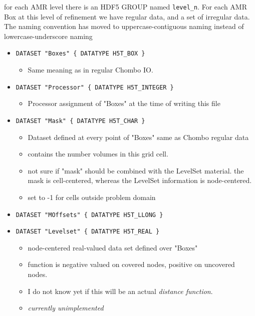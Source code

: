 for each AMR level there is an HDF5 GROUP named {\tt level\_n}.  For each AMR Box at this
level of refinement we have regular data, and a set of irregular data.  The naming convention
has moved to uppercase-contiguous naming instead of lowercase-underscore naming
\begin{itemize}

\item {\tt DATASET "Boxes" \{ DATATYPE  H5T\_BOX \}}
    \begin{itemize} \item  Same meaning as in regular Chombo IO. \end{itemize}
\item {\tt DATASET "Processor" \{ DATATYPE  H5T\_INTEGER \}}
      \begin{itemize} \item Processor assignment of "Boxes" at the time of writing this file \end{itemize}


\item {\tt DATASET "Mask" \{ DATATYPE  H5T\_CHAR \} }
    \begin{itemize}\item  Dataset defined at every point of "Boxes" same as Chombo regular data
                   \item  contains the number volumes in this grid cell.
                   \item not sure if "mask" should be combined with the LevelSet material. 
                    the mask is cell-centered, whereas the LevelSet information is node-centered.
                   \item set to -1 for cells outside problem domain
     \end{itemize}
\item  {\tt DATASET "MOffsets" \{ DATATYPE  H5T\_LLONG \} }

\item {\tt DATASET "Levelset" \{ DATATYPE  H5T\_REAL \} }
          \begin{itemize}
            \item node-centered real-valued data set defined over  "Boxes" 
            \item function is negative valued on covered nodes, positive on uncovered nodes.
            \item I do not know yet if this will be an actual {\em distance function}.
            \item {\em currently unimplemented }
          \end{itemize}


\end{itemize}
